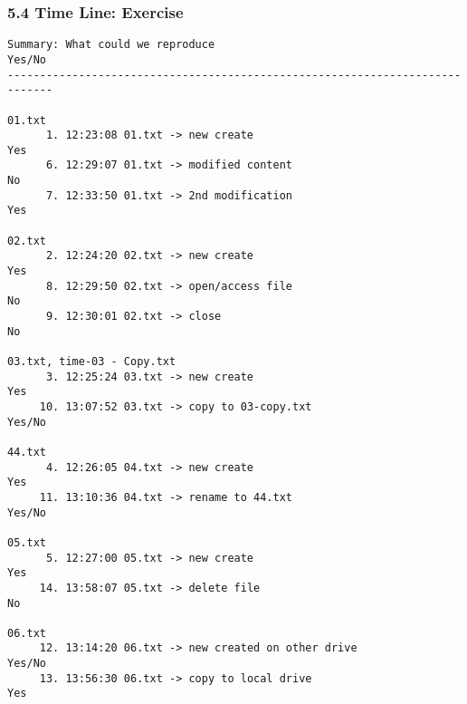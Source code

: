 \begin{frame}[fragile]
  \frametitle{5.4 Time Line: Exercise}
  \begin{lstlisting}[basicstyle=\tiny]
Summary: What could we reproduce                                       Yes/No
-----------------------------------------------------------------------------
  
01.txt
      1. 12:23:08 01.txt -> new create                                 Yes
      6. 12:29:07 01.txt -> modified content                               No
      7. 12:33:50 01.txt -> 2nd modification                           Yes

02.txt
      2. 12:24:20 02.txt -> new create                                 Yes
      8. 12:29:50 02.txt -> open/access file                               No
      9. 12:30:01 02.txt -> close                                          No

03.txt, time-03 - Copy.txt
      3. 12:25:24 03.txt -> new create                                 Yes
     10. 13:07:52 03.txt -> copy to 03-copy.txt                        Yes/No

44.txt
      4. 12:26:05 04.txt -> new create                                 Yes
     11. 13:10:36 04.txt -> rename to 44.txt                           Yes/No

05.txt
      5. 12:27:00 05.txt -> new create                                 Yes
     14. 13:58:07 05.txt -> delete file                                    No

06.txt
     12. 13:14:20 06.txt -> new created on other drive                 Yes/No
     13. 13:56:30 06.txt -> copy to local drive                        Yes
  \end{lstlisting}
\end{frame}


